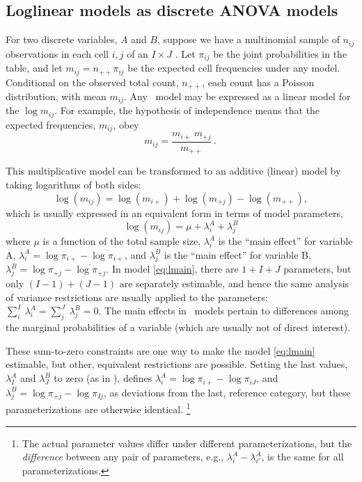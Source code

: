 \subsection{Loglinear models as discrete ANOVA models}
For two discrete variables, $A$ and $B$, suppose we have a multinomial sample of $n_{ij}$ observations in each cell $i,j$ of an $I \times J$
\ctab.
Let $\pi_{ij}$ be the joint probabilities in the table, and let
$m_{ij} = n_{++} \pi_{ij}$ be the expected cell frequencies under
any model.
Conditional on the observed total count, $n_{++}$,
each count has a Poisson distribution, with mean $m_{ij}$.
Any \loglin\ model may be expressed as a linear model for the $\log m_{ij}$.
For
example, the hypothesis of independence means that the expected
frequencies, \(m_{ij}\), obey
\begin{equation*}%
  m_{ij} = \frac{ m_{i+} \:  m_{+j} } {m_{++}}
  \period
\end{equation*}

This multiplicative model can be transformed to an additive (linear)
model by taking logarithms of both sides:
\begin{equation*}
  \log ( m_{ij} ) = \log ( m_{i+} )  +  \log ( m_{+j} )
 - \log ( m_{++} )
 \comma
\end{equation*}
which is usually expressed in an equivalent form in terms of model
parameters,
\begin{equation} \label{eq:lmain}
\log ( m_{ij} ) = \mu  +  \lambda_i^A +  \lambda_j^B
\end{equation}
where \(\mu\) is a function of the total sample size, \(\lambda_i^A\)
is the ``main effect'' for variable A,
\(\lambda_i^A = \log \pi_{i+} - \overline{\log \pi_{i+}}\),
 and \(\lambda_j^B\) is the
``main effect'' for variable B,
\(\lambda_j^B = \log \pi_{+j} - \overline{\log \pi_{+j}}\).
In model \eqref{eq:lmain}, there
are $1 + I + J$ parameters,  but only $(I-1)+(J-1)$ are separately
estimable, and hence
the same analysis of variance
restrictions are usually applied to the parameters:  \(\sum_i^I \:
\lambda_i^A  = \sum_j^J \:  \lambda_j^B = 0\).  The main effects in
\loglin\ models pertain to differences among the marginal
probabilities of a variable (which are usually not of direct interest).

These sum-to-zero constraints are one way to make  the model \eqref{eq:lmain}
estimable, but other, equivalent restrictions are possible.
Setting the last values, $\lambda_I^A$ and $\lambda_J^B$
to zero (as in ), defines
$\lambda_i^A = \log \pi_{i+} - \log \pi_{iJ}$, and
$\lambda_j^B = \log \pi_{+j} - \log \pi_{Ij}$,
as deviations from the last, reference category,
but these parameterizations are otherwise identical.
\footnote{The actual parameter values differ under different
parameterizations, but the \emph{difference} between any pair of
parameters, e.g., $\lambda_i^A - \lambda_{i'}^A$,
is the same for all parameterizations.}

